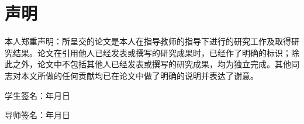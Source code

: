 {\centering\chapter*{声\hspace{2em}明}}
{
  \songti{}\linespread{2.1}\selectfont
  本人郑重声明：所呈交的论文是本人在指导教师的指导下进行的研究工作及取得研究结果。论文在引用他人已经发表或撰写的研究成果时，已经作了明确的标识；除此之外，论文中不包括其他人已经发表或撰写的研究成果，均为独立完成。其他同志对本文所做的任何贡献均已在论文中做了明确的说明并表达了谢意。\par

  \vspace{4.5cm}

  \begin{flushright}
  
  学生签名：\uline{\makebox[3cm]{}}\hspace{1.5em}\uline{\makebox[4em]{}}年\uline{\makebox[1.5em]{}}月\uline{\makebox[1.5em]{}}日

  \vspace{2cm}

  导师签名：\uline{\makebox[3cm]{}}\hspace{1.5em}\uline{\makebox[4em]{}}年\uline{\makebox[1.5em]{}}月\uline{\makebox[1.5em]{}}日

  \end{flushright}
}